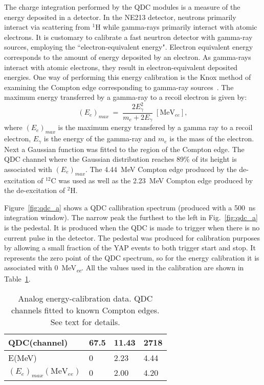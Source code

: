 \documentclass[main.tex]{subfiles}
\begin{document}
The charge integration performed by the QDC modules is a measure of the energy deposited in a detector. In the NE213 detector, neutrons primarily interact via scattering from $^1$H while gamma-rays primarily interact with atomic electrons. It is customary to calibrate a fast neurtron detector with gamma-ray sources, employing the ``electron-equivalent energy". Electron equivalent energy corresponds to the amount of energy deposited by an electron. As gamma-rays interact with atomic electrons, they result in electron-equivalent deposited energies. One way of performing this energy calibration is the Knox method of examining the Compton edge corresponding to gamma-ray sources~\cite{Nilsson}. The maximum energy transferred by a gamma-ray to a recoil electron is given by:
\begin{equation}
	(E_{e})_{max}\;=\;\frac{2E_{\gamma}^2}{m_e + 2E_\gamma} \;[\textrm{MeV}_{ee}],
\end{equation}
where $(E_e)_{max}$ is the maximum energy transfered by a gamma ray to a recoil electron, $E_\gamma$ is the energy of the gamma-ray and $m_e$ is the mass of the electron.
Next a Gaussian function was fitted to the region of the Compton edge. The QDC channel where the Gaussian distribution reaches 89\% of its height is associated with $(E_e)_{max}$. The \SI{4.44}{MeV} Compton edge produced by the de-excitation of $^{12}$C was used as well as the \SI{2.23}{MeV} Compton edge produced by the de-excitation of $^2$H.

Figure~\ref{fig:qdc_a} shows a QDC callibration spectrum (produced with a \SI{500}{ns} integration window). The narrow peak the furthest to the left in Fig.~\ref{fig:qdc_a} is the pedestal. It is produced when the QDC is made to trigger when there is no current pulse in the detector. The pedestal was produced for calibration purposes by allowing a small fraction of the YAP events to both trigger start and stop. It represents the zero point of the QDC spectrum, so for the energy calibration it is associated with \SI{0}{MeV_{\textit{ee}}}. All the values used in the calibration are shown in Table~\ref{tab:knox_a}.

\begin{table}[hb]
	\center
	\begin{tabular}{|l|l|l|l|}
	\hline
	QDC(channel)             & 67.5 & 11.43 & 2718 \\
	\hline
	E(MeV)          & 0    & 2.23  & 4.44 \\
	\hline
	$(E_{e})_{max}(\textrm{MeV}_{ee})$ & 0    & 2.00  & 4.20 \\
	\hline
	\end{tabular}
   	\captionsetup{width=0.435\linewidth}
	\caption[Analog energy-calibration data.]{Analog energy-calibration data. QDC channels fitted to known Compton edges. See text for details.}
	\label{tab:knox_a}
\end{table}
\end{document}
